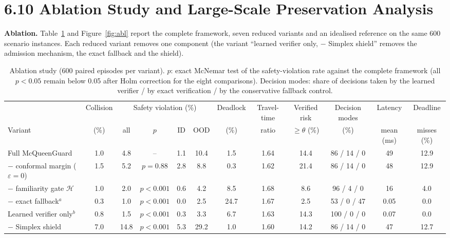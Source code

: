 \documentclass[11pt]{article}
\begin{document}
\clearpage
\section*{6.10 \quad Ablation Study and Large-Scale Preservation Analysis}
\textbf{Ablation.} Table~\ref{tab:abl} and Figure~\ref{fig:abl} report the complete framework, seven reduced variants and an idealised reference
on the same 600 scenario instances. Each reduced variant removes one component (the variant ``learned verifier only, $-$ Simplex shield''
removes the admission mechanism, the exact fallback and the shield).

\begin{table}[h]
\centering\small
\caption{Ablation study (600 paired episodes per variant). $p$: exact McNemar test of the safety-violation rate against the complete
framework (all $p<0.05$ remain below 0.05 after Holm correction for the eight comparisons). Decision modes: share of decisions taken by the learned verifier / by exact verification / by the conservative fallback control.}\label{tab:abl}
\begin{adjustbox}{max width=\linewidth}
\begin{tabular}{lccccccccccc}
\toprule
 & Collision & \multicolumn{4}{c}{Safety violation (\%)} & Deadlock & Travel-time & Verified risk & Decision modes & Latency & Deadline \\
\cmidrule(lr){3-6}
Variant & (\%) & all & $p$ & ID & OOD & (\%) & ratio & $\ge\theta$ (\%) & (\%) & mean (ms) & misses (\%) \\
\midrule
Full McQueenGuard & 1.0 & 4.8 & -- & 1.1 & 10.4 & 1.5 & 1.64 & 14.4 & 86 / 14 / 0 & 49 & 12.9 \\
$-$ conformal margin ($\varepsilon{=}0$) & 1.5 & 5.2 & $p=0.88$ & 2.8 & 8.8 & 0.3 & 1.62 & 21.4 & 86 / 14 / 0 & 48 & 12.9 \\
$-$ familiarity gate $\mathcal{H}$ & 1.0 & 2.0 & $p<0.001$ & 0.6 & 4.2 & 8.5 & 1.68 & 8.6 & 96 / 4 / 0 & 16 & 4.0 \\
$-$ exact fallback$^{a}$ & 0.3 & 1.0 & $p<0.001$ & 0.0 & 2.5 & 24.7 & 1.67 & 2.5 & 53 / 0 / 47 & 0.05 & 0.0 \\
Learned verifier only$^{b}$ & 0.8 & 1.5 & $p<0.001$ & 0.3 & 3.3 & 6.7 & 1.63 & 14.3 & 100 / 0 / 0 & 0.07 & 0.0 \\
$-$ Simplex shield & 7.0 & 14.8 & $p<0.001$ & 5.3 & 29.2 & 1.0 & 1.60 & 14.2 & 86 / 14 / 0 & 47 & 12.7 \\

\end{tabular}
\end{adjustbox}
\end{table}
\end{document}
